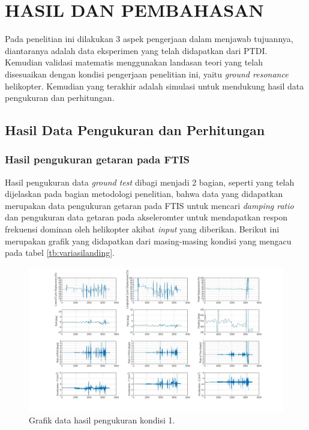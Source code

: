 \chapter{HASIL DAN PEMBAHASAN}
\label{chap:hasil dan pembahasan}


Pada penelitian ini dilakukan 3 aspek pengerjaan dalam menjawab tujuannya, diantaranya adalah data eksperimen yang telah didapatkan dari PTDI. Kemudian validasi matematis menggunakan landasan teori yang telah disesuaikan dengan kondisi pengerjaan penelitian ini, yaitu \textit{ground resonance} helikopter. Kemudian yang terakhir adalah simulasi untuk mendukung hasil data pengukuran dan perhitungan. 

\section{Hasil Data Pengukuran dan Perhitungan}
\label{sec:hasilpengukuran}

\subsection{Hasil pengukuran getaran pada FTIS}

Hasil pengukuran data \textit{ground test} dibagi menjadi 2 bagian, seperti yang telah dijelaskan pada bagian metodologi penelitian, bahwa data yang didapatkan merupakan data pengukuran getaran pada FTIS untuk mencari \textit{damping ratio} dan pengukuran data getaran pada akseleromter untuk mendapatkan respon frekuensi dominan oleh helikopter akibat \textit{input} yang diberikan. Berikut ini merupakan grafik yang didapatkan dari masing-masing kondisi yang mengacu pada tabel \ref{tb:variasilanding}.

\begin{figure}[H]
	\centering
	\includegraphics[width=0.7\linewidth]{gambar/Condition_1.jpg}
	\caption{Grafik data hasil pengukuran kondisi 1.}
	\label{fig:condition_1}
\end{figure}

